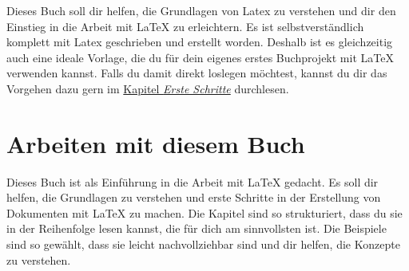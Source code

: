 Dieses Buch soll dir helfen, die Grundlagen von Latex zu verstehen und dir den Einstieg in die Arbeit mit \LaTeX{} zu erleichtern.
Es ist selbstverständlich komplett mit Latex geschrieben und erstellt worden.
Deshalb ist es gleichzeitig auch eine ideale Vorlage, die du für dein eigenes erstes Buchprojekt mit \LaTeX{} verwenden kannst.
Falls du damit direkt loslegen möchtest, kannst du dir das Vorgehen dazu gern im  \hyperlink{chapter.4}{Kapitel \textit{Erste Schritte}}  durchlesen.

\section{Arbeiten mit diesem Buch}

Dieses Buch ist als Einführung in die Arbeit mit \LaTeX{} gedacht.
Es soll dir helfen, die Grundlagen zu verstehen und erste Schritte in der Erstellung von Dokumenten mit \LaTeX{} zu machen.
Die Kapitel sind so strukturiert, dass du sie in der Reihenfolge lesen kannst, die für dich am sinnvollsten ist.
Die Beispiele sind so gewählt, dass sie leicht nachvollziehbar sind und dir helfen, die Konzepte zu verstehen.
